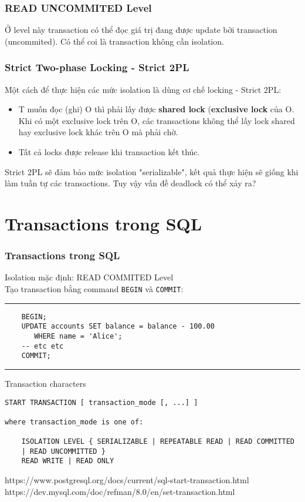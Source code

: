 \documentclass[xcolor={table, dvipsnames}]{beamer}
\begin{document}
\begin{frame}
\frametitle{READ UNCOMMITED Level}
Ở level này transaction có thể đọc giá trị đang được update bởi transaction (uncommited). Có thể coi là transaction không cần isolation.
\end{frame}

\begin{frame}
\frametitle{Strict Two-phase Locking - Strict 2PL}
Một cách để thực hiện các mức isolation là dùng cơ chế locking - Strict 2PL:
\begin{itemize}
\item T muốn đọc (ghi) O thì phải lấy được \textbf{shared lock} (\textbf{exclusive lock} của O. Khi có một exclusive lock trên O, các transactions không thể lấy lock shared hay exclusive lock khác trên O mà phải chờ.
\item Tất cả locks được release khi transaction kết thúc.
\end{itemize}
Strict 2PL sẽ đảm bảo mức isolation "serializable", kết quả thực hiện sẽ giống khi làm tuần tự các transactions. Tuy vậy vấn đề deadlock có thể xảy ra?
\end{frame}

\section{Transactions trong SQL}
\begin{frame}[fragile]
\frametitle{Transactions trong SQL}
Isolation mặc định: READ COMMITED Level\\
Tạo transaction bằng command \verb|BEGIN| và \verb|COMMIT|:
\rule{\textwidth}{1pt}
\scriptsize
\begin{verbatim}
    BEGIN;
    UPDATE accounts SET balance = balance - 100.00
       WHERE name = 'Alice';
    -- etc etc
    COMMIT;
\end{verbatim}
\rule{\textwidth}{1pt}

\begin{block}{Transaction characters}
\begin{verbatim}
START TRANSACTION [ transaction_mode [, ...] ]

where transaction_mode is one of:

    ISOLATION LEVEL { SERIALIZABLE | REPEATABLE READ | READ COMMITTED 
    | READ UNCOMMITTED }
    READ WRITE | READ ONLY
\end{verbatim}
    
https://www.postgresql.org/docs/current/sql-start-transaction.html\\
https://dev.mysql.com/doc/refman/8.0/en/set-transaction.html
\end{block}
\end{frame}
\end{document}
